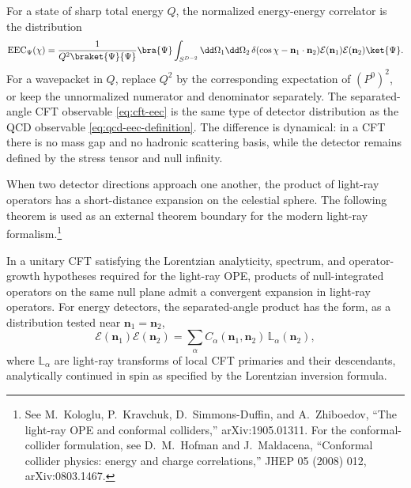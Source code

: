 For a state of sharp total energy \(Q\), the normalized energy-energy
correlator is the distribution
\begin{equation}
  \mathrm{EEC}_\Psi(\chi)
  =
  \frac{1}{Q^2\braket{\Psi}{\Psi}}
  \bra{\Psi}
  \int_{S^{D-2}}\dd\Omega_1\dd\Omega_2\,
  \delta(\cos\chi-\mathbf n_1\cdot\mathbf n_2)
  \mathcal E(\mathbf n_1)\mathcal E(\mathbf n_2)
  \ket{\Psi}.
  \label{eq:cft-eec}
\end{equation}
For a wavepacket in \(Q\), replace \(Q^2\) by the corresponding expectation
of \((P^0)^2\), or keep the unnormalized numerator and denominator separately.
The separated-angle CFT observable
\eqref{eq:cft-eec} is the same type of detector distribution as the QCD
observable \eqref{eq:qcd-eec-definition}.  The difference is dynamical:
in a CFT there is no mass gap and no hadronic scattering basis, while the
detector remains defined by the stress tensor and null infinity.

When two detector directions approach one another, the product of light-ray
operators has a short-distance expansion on the celestial sphere.  The
following theorem is used as an external theorem boundary for the modern
light-ray formalism.\footnote{See M.~Kologlu, P.~Kravchuk,
D.~Simmons-Duffin, and A.~Zhiboedov, ``The light-ray OPE and conformal
colliders,'' arXiv:1905.01311.  For the conformal-collider formulation, see
D.~M.~Hofman and J.~Maldacena, ``Conformal collider physics: energy and charge
correlations,'' JHEP 05 (2008) 012, arXiv:0803.1467.}

\begin{quotedtheorem}
\label{qthm:light-ray-ope-boundary}
In a unitary CFT satisfying the Lorentzian analyticity, spectrum, and
operator-growth hypotheses required for the light-ray OPE, products of
null-integrated operators on the same null plane admit a convergent expansion
in light-ray operators.  For energy detectors, the separated-angle product has
the form, as a distribution tested near \(\mathbf n_1=\mathbf n_2\),
\[
  \mathcal E(\mathbf n_1)\mathcal E(\mathbf n_2)
  =
  \sum_\alpha
  C_\alpha(\mathbf n_1,\mathbf n_2)\,
  \mathbb L_\alpha(\mathbf n_2),
\]
where \(\mathbb L_\alpha\) are light-ray transforms of local CFT primaries and
their descendants, analytically continued in spin as specified by the
Lorentzian inversion formula.
\end{quotedtheorem}

